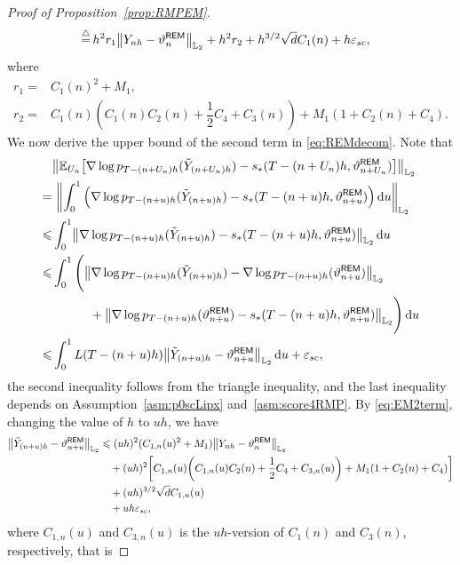 \begin{proof}[Proof of Proposition~\ref{prop:RMPEM}]
\begin{align*}
    &\mathop{=}^{\triangle}h^2r_1\l|Y_{nh}-\vartheta_n^{\sf REM}\r|_{\Ltwo}+h^2r_2+h^{3/2}\sqrt{d}C_1(n)+h\varepsilon_{sc},
\end{align*}
where
\begin{align*}
    r_1=&C_1(n)^2+M_1,\\
    r_2=&C_1(n)\left(C_1(n)C_2(n)+\dfrac{1}{2}C_4+C_3(n)\right)+M_1(1+C_2(n)+C_4).
\end{align*}
We now derive the upper bound of the second term in \eqref{eq:REMdecom}.
Note that
\begin{align}
    &\left\lVert\mathbb{E}_{U_n}\big[\nabla\log p_{T-(n+U_n)h}(\tilde{Y}_{(n+U_n)h})-s_*(T-(n+U_n)h,\vartheta_{n+U_n}^{\sf REM})\big]\right\rVert_{\Ltwo}\\
    = & \,\,\left\lVert \int_0^1\Big(\nabla\log p_{T-(n+u)h}(\tilde{Y}_{(n+u)h})-s_*(T-(n+u)h,\vartheta_{n+u}^{\sf REM}) \Big)\rmd u \right\rVert_{\Ltwo}\\
    \leqslant &\int_0^1\left\lVert \nabla\log p_{T-(n+u)h}(\tilde{Y}_{(n+u)h})-s_*(T-(n+u)h,\vartheta_{n+u}^{\sf REM})\right\rVert_{\Ltwo}\rmd u\\
    \leqslant &\int_0^1\Bigg(\l|\nabla\log p_{T-(n+u)h}(\tilde{Y}_{(n+u)h})-\nabla\log p_{T-(n+u)h}(\vartheta_{n+u}^{\sf REM})\r|_{\Ltwo}\\
    &\quad\qquad+\l|\nabla\log p_{T-(n+u)h}(\vartheta_{n+u}^{\sf REM})-s_*(T-(n+u)h,\vartheta_{n+u}^{\sf REM})\r|_{\Ltwo}\Bigg)\rmd u\\
    \leqslant &\int_0^1L(T-(n+u)h)\l|\tilde{Y}_{(n+u)h}-\vartheta_{n+u}^{\sf REM}\r|_{\Ltwo}\rmd u+\varepsilon_{sc},
\label{eq:help2}
\end{align}
the second inequality follows from the triangle inequality, and the last inequality depends on Assumption~\ref{asm:p0scLipx} and~\ref{asm:score4RMP}. By \eqref{eq:EM2term}, changing the value of $h$ to $uh$, we have
\begin{align}
    \l|\tilde{Y}_{(n+u)h}-\vartheta_{n+u}^{\sf REM}\r|_{\Ltwo}
    &\leqslant (uh)^2(C_{1,n}(u)^2+M_1)\l|Y_{nh}-\vartheta_n^{\sf REM}\r|_{\Ltwo}\\
    &\quad +(uh)^2\left[C_{1,n}(u)\left(C_{1,n}(u)C_2(n)+\dfrac{1}{2}C_4+C_{3,n}(u)\right)+M_1(1+C_2(n)+C_4)\right]\\
    &\quad +(uh)^{3/2}\sqrt{d}C_{1,n}(u)\\
    &\quad+ uh\varepsilon_{sc},
    \label{eq:help1}
\end{align}
where $C_{1,n}(u)$ and $C_{3,n}(u)$ is the $uh$-version of $C_1(n)$ and $C_3(n)$, respectively, that is

\end{proof}
